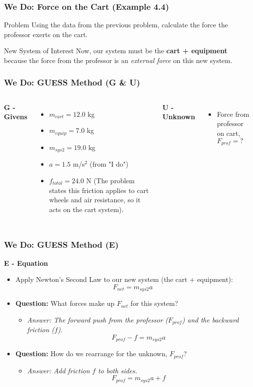 \documentclass{beamer}
\begin{document}
\begin{frame}
\frametitle{We Do: Force on the Cart (Example 4.4)}
\begin{block}{Problem}
Using the data from the previous problem, calculate the force the professor exerts on the cart.
\end{block}
\pause
\begin{alertblock}{New System of Interest}
Now, our system must be the \textbf{cart + equipment} because the force from the professor is an \textit{external force} on this new system.
\end{alertblock}
\end{frame}

\begin{frame}
\frametitle{We Do: GUESS Method (G \& U)}
\begin{columns}[T]
\textbf{G - Givens}
\begin{itemize}
\item $m_{cart} = 12.0$ kg
\item $m_{equip} = 7.0$ kg
\item $m_{sys2} = 19.0$ kg
\item $a = 1.5$ m/s$^2$ (from "I do")
\item $f_{total} = 24.0$ N (The problem states this friction applies to cart wheels and air resistance, so it acts on the cart system).
\end{itemize}

\textbf{U - Unknown}
\begin{itemize}
\item Force from professor on cart, $F_{prof} = ?$
\end{itemize}
\end{columns}
\end{frame}

\begin{frame}
\frametitle{We Do: GUESS Method (E)}
\textbf{E - Equation}
\begin{itemize}
    \item Apply Newton's Second Law to our new system (the cart + equipment):
    \[ F_{net} = m_{sys2} a \]
    \pause
    \item \textbf{Question:} What forces make up $F_{net}$ for this system?
    \begin{itemize}
        \item \textit{Answer: The forward push from the professor ($F_{prof}$) and the backward friction ($f$).}
        \[ F_{prof} - f = m_{sys2} a \]
    \end{itemize}
    \pause
    \item \textbf{Question:} How do we rearrange for the unknown, $F_{prof}$?
    \begin{itemize}
        \item \textit{Answer: Add friction $f$ to both sides.}
        \[ F_{prof} = m_{sys2} a + f \]
    \end{itemize}
\end{itemize}
\end{frame}
\end{document}
